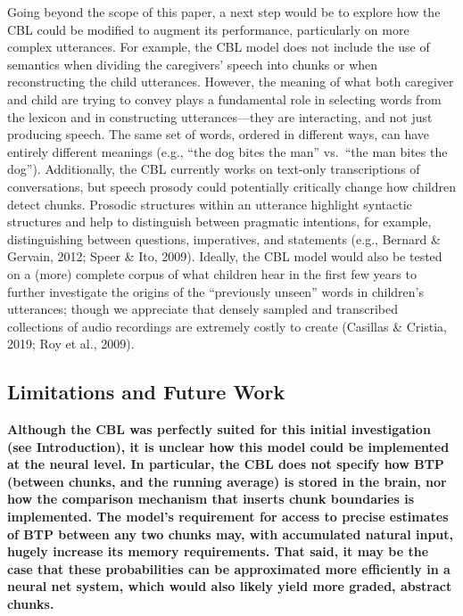\documentclass[
  english,
  man,mask,floatsintext]{apa6}
\begin{document}
Going beyond the scope of this paper, a next step would be to explore how the CBL could be modified to augment its performance, particularly on more complex utterances. For example, the CBL model does not include the use of semantics when dividing the caregivers' speech into chunks or when reconstructing the child utterances. However, the meaning of what both caregiver and child are trying to convey plays a fundamental role in selecting words from the lexicon and in constructing utterances---they are interacting, and not just producing speech. The same set of words, ordered in different ways, can have entirely different meanings (e.g., \enquote{the dog bites the man} vs.~\enquote{the man bites the dog}). Additionally, the CBL currently works on text-only transcriptions of conversations, but speech prosody could potentially critically change how children detect chunks. Prosodic structures within an utterance highlight syntactic structures and help to distinguish between pragmatic intentions, for example, distinguishing between questions, imperatives, and statements (e.g., Bernard \& Gervain, 2012; Speer \& Ito, 2009). Ideally, the CBL model would also be tested on a (more) complete corpus of what children hear in the first few years to further investigate the origins of the \enquote{previously unseen} words in children's utterances; though we appreciate that densely sampled and transcribed collections of audio recordings are extremely costly to create (Casillas \& Cristia, 2019; Roy et al., 2009).

\hypertarget{limitations-and-future-work}{%
\subsection{Limitations and Future Work}\label{limitations-and-future-work}}

\textbf{Although the CBL was perfectly suited for this initial investigation (see Introduction), it is unclear how this model could be implemented at the neural level. In particular, the CBL does not specify how BTP (between chunks, and the running average) is stored in the brain, nor how the comparison mechanism that inserts chunk boundaries is implemented. The model's requirement for access to precise estimates of BTP between any two chunks may, with accumulated natural input, hugely increase its memory requirements. That said, it may be the case that these probabilities can be approximated more efficiently in a neural net system, which would also likely yield more graded, abstract chunks.}
\end{document}
